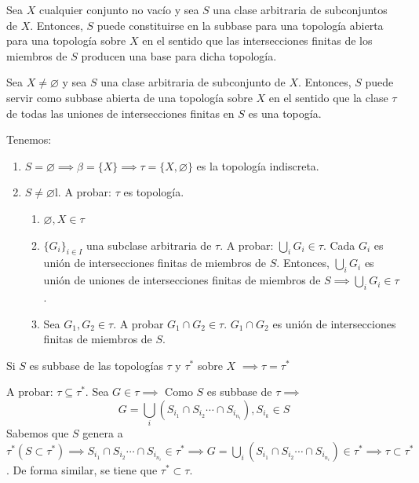 \begin{teorema}
    Sea $X$ cualquier conjunto no vacío y sea $S$ una clase arbitraria de subconjuntos de $X$. Entonces, $S$ puede constituirse en la subbase para una topología abierta para una topología sobre $X$ en el sentido que las intersecciones finitas de los miembros de $S$ producen una base para dicha topología. 
\end{teorema}

\begin{teorema}
    Sea $X\neq \varnothing$ y sea $S$ una clase arbitraria de subconjunto de $X$. Entonces, $S$ puede servir como subbase abierta de una topología sobre $X$ en el sentido que la clase $\tau$ de todas las uniones de intersecciones finitas en $S$ es una topogía. 
    \begin{dem}
        Tenemos:
        \begin{enumerate}
            \item $S=\varnothing\implies \beta =\{X\}\implies \tau=\{X,\varnothing\}$ es la topología indiscreta.
            \item $S\neq \varnothing$l. A probar: $\tau$ es topología. 
            \begin{enumerate}
                \item $\varnothing, X\in \tau $
                \item $\{G_i\}_{i\in I}$ una subclase arbitraria de $\tau$. A probar: $\bigcup_i G_i\in \tau$. Cada $G_i$ es unión de intersecciones finitas de miembros de $S$. Entonces, $\bigcup_i G_i$ es unión de uniones de intersecciones finitas de miembros de $S \implies \bigcup_i G_i\in \tau$. 
                \item Sea $G_1,G_2\in \tau$. A probar $G_1\cap G_2\in \tau$. $G_1\cap G_2$ es unión de intersecciones finitas de miembros de $S$. 
            \end{enumerate}
        \end{enumerate}
    \end{dem}
    \begin{lema}
        Si $S$ es subbase de las topologías $\tau$ y $\tau^*$ sobre $X$ $\implies \tau = \tau^*$ 
        \begin{dem}
            A probar: $\tau\subseteq \tau^*$. Sea $G\in \tau\implies$ Como $S$ es subbase de $\tau\implies$ 
            $$G=\bigcup_i\left(S_{i_1}\cap S_{i_2}\cdots \cap S_{i_{n_i}}\right), S_{i_k}\in S$$ 
            Sabemos que $S$ genera a $\tau^* (S\subset \tau^*)\implies S_{i_1}\cap S_{i_2}\cdots \cap S_{i_{n_i}}\in \tau^*\implies G=\bigcup_i\left(S_{i_1}\cap S_{i_2}\cdots \cap S_{i_{n_i}}\right)\in \tau^*\implies \tau\subset \tau^* $. De forma similar, se tiene que $\tau^*\subset \tau$. 
        \end{dem}
    \end{lema}
\end{teorema}

